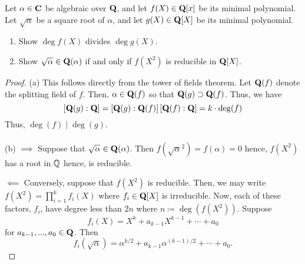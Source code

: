\begin{problem}
Let $\alpha\in\mathbf{C}$ be algebraic over $\mathbf{Q}$, and let $f(X)\in\mathbf{Q}[x]$ be
its minimal polynomial. Let $\sqrt{\alpha}$ be a square root of $\alpha$,
and let $g(X)\in\mathbf{Q}[X]$ be its minimal polynomial.
\begin{enumerate}[label=(\alph*)]
\item Show $\deg f(X)$ divides $\deg g(X)$.
\item Show $\sqrt{\alpha}\in\mathbf{Q}(\alpha)$ if and only if $f(X^2)$ is
  reducible in $\mathbf{Q}[X]$.
\end{enumerate}
\end{problem}
\begin{proof}
(a) This follows directly from the tower of fields theorem. Let $\mathbf{Q}(f)$
denote the splitting field of $f$. Then, $\alpha\in\mathbf{Q}(f)$ so that
$\mathbf{Q}(g)\supset\mathbf{Q}(f)$. Thus, we have
\[
\left[\mathbf{Q}(g):\mathbf{Q}\right]=\left[\mathbf{Q}(g):\mathbf{Q}(f)\right]\left[\mathbf{Q}(f):\mathbf{Q}\right]=k\cdot\deg(f)
\]
Thus, $\deg(f)\mid\deg(g)$.
\\\\
(b) $\implies$ Suppose that $\sqrt{\alpha}\in\mathbf{Q}(\alpha)$. Then
$f({\sqrt{\alpha}}^2)=f(\alpha)=0$ hence, $f(X^2)$ has a root in $\mathbb{Q}$
hence, is reducible.

$\impliedby$ Conversely, suppose that $f(X^2)$ is reducible. Then, we may
write $f(X^2)=\prod_{i=1}^k f_i(X)$ where $f_i\in\mathbf{Q}[X]$ is
irreducible. Now, each of these factors, $f_i$, have degree less than $2n$
where $n\coloneqq\deg\left(f(X^2)\right)$. Suppose
\[
f_i(X)=X^k+a_{k-1}X^{k-1}+\cdots+a_0
\]
for $a_{k-1},...,a_0\in\mathbf{Q}$. Then
\[
f_i(\sqrt{\alpha})=\alpha^{k/2}+a_{k-1}\alpha^{(k-1)/2}+\cdots+a_0.
\]
\end{proof}

